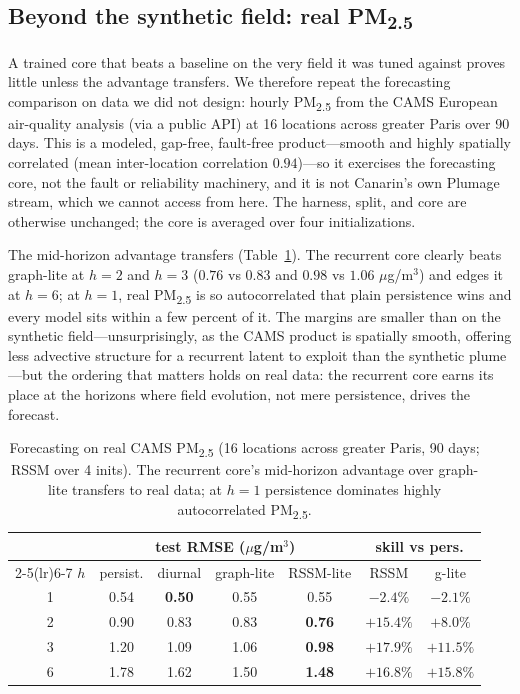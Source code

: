\documentclass[10pt]{article}
\begin{document}
\subsection{Beyond the synthetic field: real PM\textsubscript{2.5}}
\label{sec:real}
A trained core that beats a baseline on the very field it was tuned against proves
little unless the advantage transfers. We therefore repeat the forecasting
comparison on data we did not design: hourly PM\textsubscript{2.5} from the CAMS
European air-quality analysis (via a public API) at 16 locations across greater
Paris over 90 days. This is a modeled, gap-free, fault-free product---smooth and
highly spatially correlated (mean inter-location correlation $0.94$)---so it
exercises the forecasting core, not the fault or reliability machinery, and it is
not Canarin's own Plumage stream, which we cannot access from here. The harness,
split, and core are otherwise unchanged; the core is averaged over four
initializations.

The mid-horizon advantage transfers (Table~\ref{tab:real}). The recurrent core
clearly beats graph-lite at $h=2$ and $h=3$ ($0.76$ vs $0.83$ and $0.98$ vs $1.06$
$\mu$g/m$^3$) and edges it at $h=6$; at $h=1$, real PM\textsubscript{2.5} is so
autocorrelated that plain persistence wins and every model sits within a few percent
of it. The margins are smaller than on the synthetic field---unsurprisingly, as the
CAMS product is spatially smooth, offering less advective structure for a recurrent
latent to exploit than the synthetic plume---but the ordering that matters holds on
real data: the recurrent core earns its place at the horizons where field evolution,
not mere persistence, drives the forecast.

\begin{table}[t]
\centering
\small
\begin{tabular}{@{}c cccc cc@{}}
\toprule
& \multicolumn{4}{c}{\textbf{test RMSE} ($\mu$g/m$^3$)} & \multicolumn{2}{c}{skill vs pers.} \\
\cmidrule(lr){2-5}\cmidrule(lr){6-7}
$h$ & persist. & diurnal & graph-lite & RSSM-lite & RSSM & g-lite \\
\midrule
1 & 0.54 & \textbf{0.50} & 0.55 & 0.55 & $-2.4\%$ & $-2.1\%$ \\
2 & 0.90 & 0.83 & 0.83 & \textbf{0.76} & $+15.4\%$ & $+8.0\%$ \\
3 & 1.20 & 1.09 & 1.06 & \textbf{0.98} & $+17.9\%$ & $+11.5\%$ \\
6 & 1.78 & 1.62 & 1.50 & \textbf{1.48} & $+16.8\%$ & $+15.8\%$ \\
\bottomrule
\end{tabular}
\caption{Forecasting on real CAMS PM\textsubscript{2.5} (16 locations across greater
Paris, 90 days; RSSM over 4 inits). The recurrent core's mid-horizon advantage over
graph-lite transfers to real data; at $h=1$ persistence dominates highly
autocorrelated PM\textsubscript{2.5}.}
\label{tab:real}
\end{table}
\end{document}
